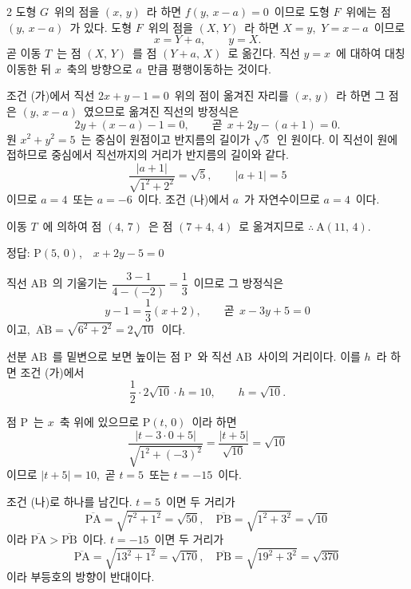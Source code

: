 \documentclass[10pt,fleqn]{article}
\begin{document}
\begin{multicols*}{2}
도형 $G$\ 위의 점을 $(x,\,y)$\ 라 하면 $f(y,\,x-a)=0$\ 이므로 도형 $F$\ 위에는 점 $(y,\,x-a)$\ 가 있다. 도형 $F$\ 위의 점을 $(X,\,Y)$\ 라 하면 $X=y$,\ $Y=x-a$\ 이므로
$$x=Y+a,\qquad y=X.$$
곧 이동 $T$\ 는 점 $(X,\,Y)$\ 를 점 $(Y+a,\,X)$\ 로 옮긴다. 직선 $y=x$\ 에 대하여 대칭이동한 뒤 $x$\ 축의 방향으로 $a$\ 만큼 평행이동하는 것이다.

조건 (가)에서 직선 $2x+y-1=0$\ 위의 점이 옮겨진 자리를 $(x,\,y)$\ 라 하면 그 점은 $(y,\,x-a)$\ 였으므로 옮겨진 직선의 방정식은
$$2y+(x-a)-1=0,\qquad \text{곧}\ \ x+2y-(a+1)=0.$$
원 $x^{2}+y^{2}=5$\ 는 중심이 원점이고 반지름의 길이가 $\sqrt{5}$\ 인 원이다. 이 직선이 원에 접하므로 중심에서 직선까지의 거리가 반지름의 길이와 같다.
$$\dfrac{|a+1|}{\sqrt{1^{2}+2^{2}}}=\sqrt{5},\qquad |a+1|=5$$
이므로 $a=4$\ 또는 $a=-6$\ 이다. 조건 (나)에서 $a$\ 가 자연수이므로 $a=4$\ 이다.

이동 $T$\ 에 의하여 점 $(4,\,7)$\ 은 점 $(7+4,\,4)$\ 로 옮겨지므로 $\therefore\ \mathrm{A}(11,\,4)$.

\begin{dmanswerbox}
정답: $\mathrm{P}(5,\,0)$,\ \ $x+2y-5=0$
\end{dmanswerbox}

직선 $\mathrm{AB}$\ 의 기울기는 $\dfrac{3-1}{4-(-2)}=\dfrac{1}{3}$\ 이므로 그 방정식은
$$y-1=\dfrac{1}{3}(x+2),\qquad \text{곧}\ \ x-3y+5=0$$
이고,\ $\overline{\mathrm{AB}}=\sqrt{6^{2}+2^{2}}=2\sqrt{10}$\ 이다.

선분 $\mathrm{AB}$\ 를 밑변으로 보면 높이는 점 $\mathrm{P}$\ 와 직선 $\mathrm{AB}$\ 사이의 거리이다. 이를 $h$\ 라 하면 조건 (가)에서
$$\dfrac{1}{2}\cdot 2\sqrt{10}\cdot h=10,\qquad h=\sqrt{10}.$$

점 $\mathrm{P}$\ 는 $x$\ 축 위에 있으므로 $\mathrm{P}(t,\,0)$\ 이라 하면
$$\dfrac{|t-3\cdot 0+5|}{\sqrt{1^{2}+(-3)^{2}}}=\dfrac{|t+5|}{\sqrt{10}}=\sqrt{10}$$
이므로 $|t+5|=10$,\ 곧 $t=5$\ 또는 $t=-15$\ 이다.

조건 (나)로 하나를 남긴다. $t=5$\ 이면 두 거리가
$$\overline{\mathrm{PA}}=\sqrt{7^{2}+1^{2}}=\sqrt{50},\quad \overline{\mathrm{PB}}=\sqrt{1^{2}+3^{2}}=\sqrt{10}$$
이라 $\overline{\mathrm{PA}}>\overline{\mathrm{PB}}$\ 이다. $t=-15$\ 이면 두 거리가
$$\overline{\mathrm{PA}}=\sqrt{13^{2}+1^{2}}=\sqrt{170},\quad \overline{\mathrm{PB}}=\sqrt{19^{2}+3^{2}}=\sqrt{370}$$
이라 부등호의 방향이 반대이다.


\end{multicols*}
\end{document}
